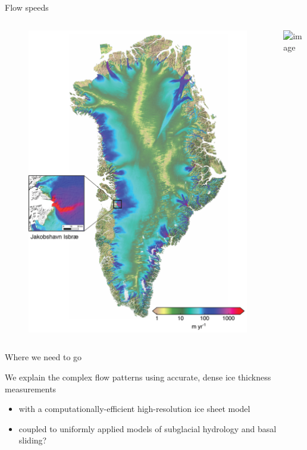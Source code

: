 \documentclass[hide notes,intlimits]{beamer}
\begin{document}
\begin{frame}{Flow speeds}
\vspace{-0.74em}
  \begin{columns}
    \column[c]{5cm}
    \begin{figure}
      \includegraphics[width=\textwidth]{greenland-obs-overview}
    \end{figure}
    \column[c]{5cm}
    \includegraphics<1>[width=\textwidth]{jakobshavn-obs-nogate}
  \end{columns}
\end{frame}



\begin{frame}{Where we need to go}
  \begin{block}{We explain the complex flow patterns using accurate, dense ice thickness measurements}
    \begin{itemize}
    \item with a computationally-efficient high-resolution ice sheet model
    \item coupled to uniformly applied models of subglacial hydrology and basal sliding?
    \end{itemize}
  \end{block}
\end{frame}
\end{document}
